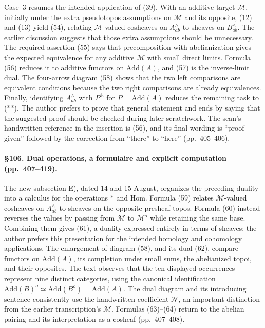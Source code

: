 Case~3 resumes the intended application of (39). With an additive target $\mathcal M$, initially under the extra pseudotopos assumptions on $\mathcal M$ and its opposite, (12) and (13) yield (54), relating $\mathcal M$-valued cosheaves on $A^\wedge_{ab}$ to sheaves on $B^\wedge_{ab}$. The earlier discussion suggests that those extra assumptions should be unnecessary. The required assertion (55) says that precomposition with abelianization gives the expected equivalence for any additive $\mathcal M$ with small direct limits. Formula (56) reduces it to additive functors on $\mathrm{Add}(A)$, and (57) is the inverse-limit dual. The four-arrow diagram (58) shows that the two left comparisons are equivalent conditions because the two right comparisons are already equivalences. Finally, identifying $A^\wedge_{ab}$ with $P^{\&}$ for $P=\mathrm{Add}(A)$ reduces the remaining task to (**). The author prefers to prove that general statement and ends by saying that the suggested proof should be checked during later scratchwork. The scan's handwritten reference in the insertion is (56), and its final wording is “proof given” followed by the correction from “there” to “here” (pp.\ 405--406).


\paragraph{\S106. Dual operations, a formulaire and explicit computation (pp.\ 407--419).}
The new subsection E), dated 14 and 15 August, organizes the preceding duality into a calculus for the operations $*$ and Hom. Formula (59) relates $\mathcal M$-valued cosheaves on $A^\wedge_{ab}$ to sheaves on the opposite presheaf topos. Formula (60) instead reverses the values by passing from $\mathcal M$ to $\mathcal M^o$ while retaining the same base. Combining them gives (61), a duality expressed entirely in terms of sheaves; the author prefers this presentation for the intended homology and cohomology applications. The enlargement of diagram (58), and its dual (62), compare functors on $\mathrm{Add}(A)$, its completion under small sums, the abelianized topoi, and their opposites. The text observes that the ten displayed occurrences represent nine distinct categories, using the canonical identification $\mathrm{Add}(B)^o\simeq\mathrm{Add}(B^o)=\mathrm{Add}(A)$. The dual diagram and its introducing sentence consistently use the handwritten coefficient $\mathcal N$, an important distinction from the earlier transcription's $\mathcal M$. Formulas (63)--(64) return to the abelian pairing and its interpretation as a cosheaf (pp.\ 407--408).

